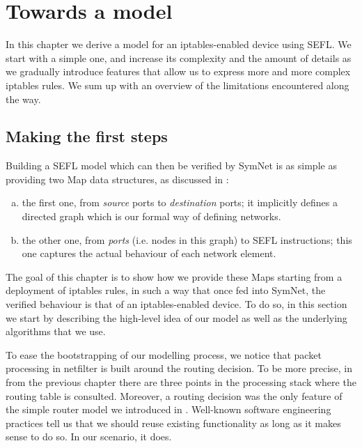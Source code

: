 \chapter{Towards a model}\label{chapter:model}
In this chapter we derive a model for an iptables-enabled device using SEFL.
We start with a simple one, and increase its complexity and the amount of
details as we gradually introduce features that allow us to express more and
more complex iptables rules.  We sum up with an overview of the limitations
encountered along the way.


\section{Making the first steps}

Building a SEFL model which can then be verified by SymNet is as simple as
providing two Map data structures, as discussed in
:
\begin{enumerate}[a)]
  \item the first one, from \emph{source} ports to \emph{destination} ports; it
    implicitly defines a directed graph which is our formal way of defining
    networks.
  \item the other one, from \emph{ports} (i.e. nodes in this graph) to SEFL
    instructions; this one captures the actual behaviour of each network
    element.
\end{enumerate}

The goal of this chapter is to show how we provide these Maps starting from a
deployment of iptables rules, in such a way that once fed into SymNet, the
verified behaviour is that of an iptables-enabled device.  To do so, in this
section we start by describing the high-level idea of our model as well as the
underlying algorithms that we use.

\bigskip

To ease the bootstrapping of our modelling process, we notice that packet
processing in netfilter is built around the routing decision.  To be more
precise, in  from the previous
chapter there are three points in the processing stack where the routing table
is consulted.  Moreover, a routing decision was the only feature of the simple
router model we introduced in .
Well-known software engineering practices tell us that we should reuse existing
functionality as long as it makes sense to do so.  In our scenario, it does.

